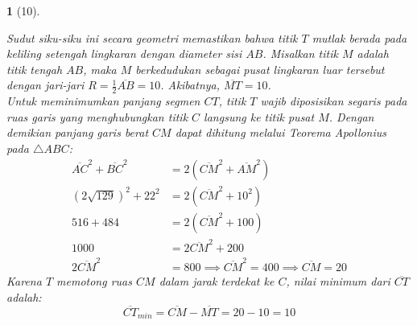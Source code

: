 \documentclass[11pt,a4paper,DIV=12]{scrartcl}
\theoremstyle{problemstyle}
\theoremstyle{answerstyle}
\newtheorem{answer}{}
\begin{document}
\begin{answer}[10]
\begin{center}
  \end{center}
  Sudut siku-siku ini secara geometri memastikan bahwa titik $T$ mutlak berada pada keliling setengah lingkaran dengan diameter sisi $AB$.
  Misalkan titik $M$ adalah titik tengah $AB$, maka $M$ berkedudukan sebagai pusat lingkaran luar tersebut dengan jari-jari $R = \frac{1}{2}\overline{AB} = 10$. Akibatnya, $\overline{MT} = 10$.\\
  Untuk meminimumkan panjang segmen $CT$, titik $T$ wajib diposisikan segaris pada ruas garis yang menghubungkan titik $C$ langsung ke titik pusat $M$.
  Dengan demikian panjang garis berat $CM$ dapat dihitung melalui Teorema Apollonius pada $\triangle ABC$:
  $$ \begin{aligned} \overline{AC}^2 + \overline{BC}^2 &= 2(\overline{CM}^2 + \overline{AM}^2) \\ (2\sqrt{129})^2 + 22^2 &= 2(\overline{CM}^2 + 10^2) \\ 516 + 484 &= 2(\overline{CM}^2 + 100) \\ 1000 &= 2\overline{CM}^2 + 200 \\ 2\overline{CM}^2 &= 800 \implies \overline{CM}^2 = 400 \implies \overline{CM} = 20 \end{aligned} $$
  Karena $T$ memotong ruas $CM$ dalam jarak terdekat ke $C$, nilai minimum dari $\overline{CT}$ adalah:
  $$ \overline{CT}_{min} = \overline{CM} - \overline{MT} = 20 - 10 = \boxed{10} $$
\end{answer}
\end{document}
